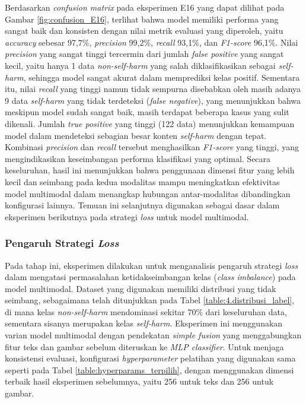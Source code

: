 Berdasarkan \textit{confusion matrix} pada eksperimen E16 yang dapat dilihat pada Gambar \ref{fig:confusion_E16}, terlihat bahwa model memiliki performa yang sangat baik dan konsisten dengan nilai metrik evaluasi yang diperoleh, yaitu \textit{accuracy} sebesar 97,7\%, \textit{precision} 99,2\%, \textit{recall} 93,1\%, dan \textit{F1-score} 96,1\%. Nilai \textit{precision} yang sangat tinggi tercermin dari jumlah \textit{false positive} yang sangat kecil, yaitu hanya 1 data \textit{non-self-harm} yang salah diklasifikasikan sebagai \textit{self-harm}, sehingga model sangat akurat dalam memprediksi kelas positif. Sementara itu, nilai \textit{recall} yang tinggi namun tidak sempurna disebabkan oleh masih adanya 9 data \textit{self-harm} yang tidak terdeteksi (\textit{false negative}), yang menunjukkan bahwa meskipun model sudah sangat baik, masih terdapat beberapa kasus yang sulit dikenali. Jumlah \textit{true positive} yang tinggi (122 data) menunjukkan kemampuan model dalam mendeteksi sebagian besar konten \textit{self-harm} dengan tepat. Kombinasi \textit{precision} dan \textit{recall} tersebut menghasilkan \textit{F1-score} yang tinggi, yang mengindikasikan keseimbangan performa klasifikasi yang optimal. Secara keseluruhan, hasil ini menunjukkan bahwa penggunaan dimensi fitur yang lebih kecil dan seimbang pada kedua modalitas mampu meningkatkan efektivitas model multimodal dalam menangkap hubungan antar-modalitas dibandingkan konfigurasi lainnya. Temuan ini selanjutnya digunakan sebagai dasar dalam eksperimen berikutnya pada strategi \textit{loss} untuk model multimodal.




\subsubsection{Pengaruh Strategi \textit{Loss}}
\label{IV.MultimodalLoss}
Pada tahap ini, eksperimen dilakukan untuk menganalisis pengaruh strategi \textit{loss} dalam mengatasi permasalahan ketidakseimbangan kelas (\textit{class imbalance}) pada model multimodal. Dataset yang digunakan memiliki distribusi yang tidak seimbang, sebagaimana telah ditunjukkan pada Tabel \ref{table:4.distribusi_label}, di mana kelas \textit{non-self-harm} mendominasi sekitar 70\% dari keseluruhan data, sementara sisanya merupakan kelas \textit{self-harm}. Eksperimen ini menggunakan varian model multimodal dengan pendekatan \textit{simple fusion} yang menggabungkan fitur teks dan gambar sebelum diteruskan ke \textit{MLP classifier}. Untuk menjaga konsistensi evaluasi, konfigurasi \textit{hyperparameter} pelatihan yang digunakan sama seperti pada Tabel \ref{table:hyperparams_terpilih}, dengan menggunakan dimensi terbaik hasil eksperimen sebelumnya, yaitu 256 untuk teks dan 256 untuk gambar.

